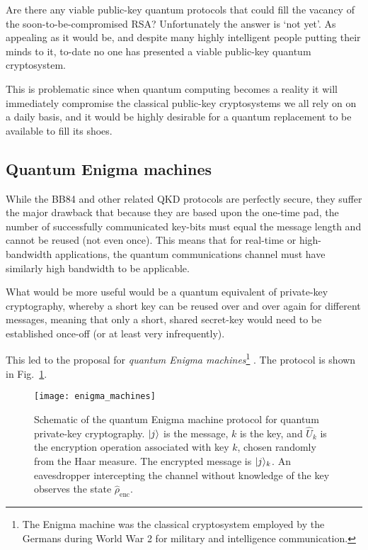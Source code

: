 Are there any viable public-key quantum protocols that could fill the vacancy of the soon-to-be-compromised RSA? Unfortunately the answer is `not yet'. As appealing as it would be, and despite many highly intelligent people putting their minds to it, to-date no one has presented a viable public-key quantum cryptosystem.

This is problematic since when quantum computing becomes a reality it will immediately compromise the classical public-key cryptosystems we all rely on on a daily basis, and it would be highly desirable for a quantum replacement to be available to fill its shoes.

%
%

\subsection{Quantum Enigma machines}

While the BB84 and other related QKD protocols are perfectly secure, they suffer the major drawback that because they are based upon the one-time pad, the number of successfully communicated key-bits must equal the message length and cannot be reused (not even once). This means that for real-time or high-bandwidth applications, the quantum communications channel must have similarly high bandwidth to be applicable.

What would be more useful would be a quantum equivalent of private-key cryptography, whereby a short key can be reused over and over again for different messages, meaning that only a short, shared secret-key would need to be established once-off (or at least very infrequently).

This led to the proposal for \textit{quantum Enigma machines}\footnote{The Enigma machine was the classical cryptosystem employed by the Germans during World War 2 for military and intelligence communication.} \cite{bib:LloydEnigma}. The protocol is shown in Fig.~\ref{fig:enigma}.

\begin{figure}[!htbp]
\texttt{[image: enigma\_machines]}
\captionspacefig \caption{Schematic of the quantum Enigma machine protocol for quantum private-key cryptography. $|j\rangle$ is the message, $k$ is the key, and $\hat{U}_k$ is the encryption operation associated with key $k$, chosen randomly from the Haar measure. The encrypted message is $|j\rangle_k$. An eavesdropper intercepting the channel without knowledge of the key observes the state $\hat\rho_\mathrm{enc}$.}\label{fig:enigma}	
\end{figure}

